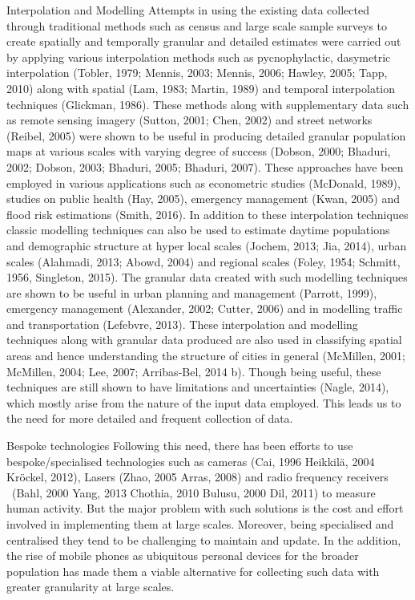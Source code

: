  Interpolation and Modelling
 Attempts in using the existing data collected through traditional methods such as census and large scale sample surveys to create spatially and temporally granular and detailed estimates were carried out by applying various interpolation methods such as pycnophylactic, dasymetric interpolation (Tobler, 1979; Mennis, 2003; Mennis, 2006; Hawley, 2005; Tapp, 2010) along with spatial (Lam, 1983; Martin, 1989) and temporal interpolation techniques (Glickman, 1986). These methods along with supplementary data such as remote sensing imagery (Sutton, 2001; Chen, 2002) and street networks (Reibel, 2005) were shown to be useful in producing detailed granular population maps at various scales with varying degree of success (Dobson, 2000; Bhaduri, 2002; Dobson, 2003; Bhaduri, 2005; Bhaduri, 2007). These approaches have been employed in various applications such as econometric studies (McDonald, 1989), studies on public health (Hay, 2005), emergency management (Kwan, 2005) and flood risk estimations (Smith, 2016). In addition to these interpolation techniques classic modelling techniques can also be used to estimate daytime populations and demographic structure at hyper local scales (Jochem, 2013; Jia, 2014), urban scales (Alahmadi, 2013; Abowd, 2004) and regional scales (Foley, 1954; Schmitt, 1956, Singleton, 2015). The granular data created with such modelling techniques are shown to be useful in urban planning and management (Parrott, 1999), emergency management (Alexander, 2002; Cutter, 2006) and in modelling traffic and transportation (Lefebvre, 2013). These interpolation and modelling techniques along with granular data produced are also used in classifying spatial areas and hence understanding the structure of cities in general (McMillen, 2001; McMillen, 2004; Lee, 2007; Arribas-Bel, 2014 b). Though being useful, these techniques are still shown to have limitations and uncertainties (Nagle, 2014), which mostly arise from the nature of the input data employed. This leads us to the need for more detailed and frequent collection of data.

 Bespoke technologies
 Following this need, there has been efforts to use bespoke/specialised technologies such as cameras (Cai, 1996 Heikkilä, 2004 Kröckel, 2012), Lasers (Zhao, 2005 Arras, 2008) and radio frequency receivers  (Bahl, 2000 Yang, 2013 Chothia, 2010 Bulusu, 2000 Dil, 2011) to measure human activity. But the major problem with such solutions is the cost and effort involved in implementing them at large scales. Moreover, being specialised and centralised they tend to be challenging to maintain and update. In the addition, the rise of mobile phones as ubiquitous personal devices for the broader population has made them a viable alternative for collecting such data with greater granularity at large scales.

